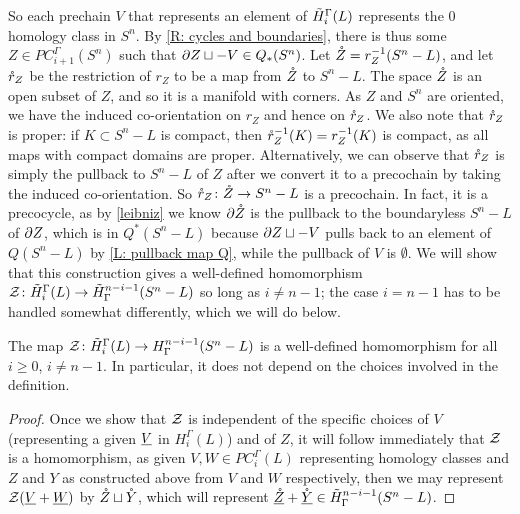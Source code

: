 \begin{example}
So each prechain $V$ that represents an element of $\tilde H_i^\Gamma(L)$ represents the $0$ homology class in $S^n$. By \cref{R: cycles and boundaries}, there is thus some $Z \in PC^\Gamma_{i+1}(S^n)$ such that $\partial Z \sqcup -V \in Q_*(S^n)$.
Let $\mathring{Z} = r_Z^{-1}(S^n-L)$, and let $\mathring{r}_Z$ be the restriction of $r_Z$ to be a map from $\mathring{Z}$ to $S^n-L$.
The space $\mathring{Z}$ is an open subset of $Z$, and so it is a manifold with corners.
As $Z$ and $S^n$ are oriented, we have the induced co-orientation on $r_Z$ and hence on $\mathring{r}_Z$.  We also note that $\mathring{r}_Z$ is proper: if $K \subset S^n-L$ is compact, then $\mathring{r}_Z^{-1}(K) = r_Z^{-1}(K)$ is compact, as all maps with compact domains are proper.
Alternatively, we can observe that $\mathring{r}_Z$ is simply the pullback to $S^n-L$ of $Z$ after we convert it to a precochain by taking the induced co-orientation.
So $\mathring{r}_Z \colon \mathring{Z} \to S^n - L$ is a precochain.
In fact, it is a precocycle, as by \cref{leibniz} we know $\partial{\mathring{Z}}$ is the pullback to the boundaryless $S^n-L$ of $\partial Z$, which is in $Q^*(S^n-L)$ because $\partial Z \sqcup -V$ pulls back to an element of $Q(S^n-L)$ by \cref{L: pullback map Q}, while the pullback of $V$ is $\emptyset$.
We will show that this construction gives a well-defined homomorphism $\mathcal{Z} \colon \tilde H_i^\Gamma(L) \to \tilde H^{n-i-1}_\Gamma(S^n-L)$ so long as $i \neq n-1$; the case $i = n-1$ has to be handled somewhat differently, which we will do below.



\begin{proposition}
The map $\mathcal{Z} \colon \tilde H_i^\Gamma(L) \to H^{n-i-1}_\Gamma(S^n-L)$ is a well-defined homomorphism for all $i \geq 0$, $i \neq n-1$.
In particular, it does not depend on the choices involved in the definition.
\end{proposition}
\begin{proof}
Once we show that $\mathcal{Z}$ is independent of the specific choices of $V$ (representing a given $\underline{V}$ in $H_i^\Gamma(L)$) and of $Z$, it will follow immediately that $\mathcal{Z}$ is a homomorphism, as given $V,W\in PC_i^\Gamma(L)$ representing homology classes and $Z$ and $Y$ as constructed above from $V$ and $W$ respectively, then we may represent $\mathcal{Z}(\underline{V} + \underline{W})$ by $\mathring{Z} \sqcup \mathring{Y}$, which will represent $\underline{\mathring{Z}}+\underline{\mathring{Y}}\in \tilde H^{n-i-1}_\Gamma(S^n-L)$.


\end{proof}
\end{example}
